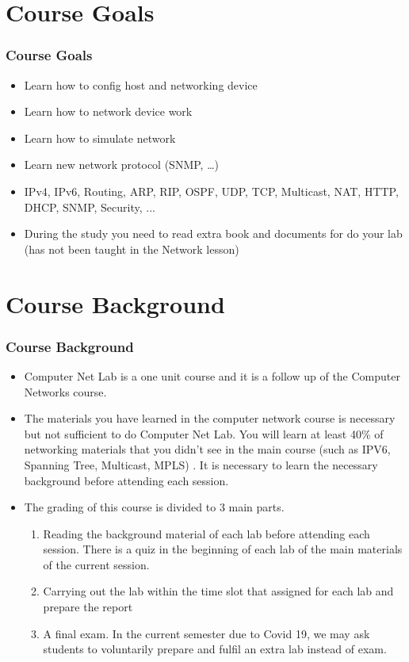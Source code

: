 \documentclass[aspectratio=169,15pt]{beamer}
\begin{document}
\section{Course Goals}
\begin{frame}
    \frametitle{Course Goals}

    \begin{itemize}
        \item Learn how to config host and networking device
        \item Learn how to network device work
        \item Learn how to simulate network
        \item Learn new network protocol (SNMP, \dots)
        \item IPv4, IPv6, Routing, ARP, RIP, OSPF, UDP, TCP, Multicast, NAT, HTTP, DHCP, SNMP, Security, ...         
        \item During the study you need to read extra book and documents for do your lab (has not been taught in the Network lesson)
    \end{itemize}

\end{frame}

\section{Course Background}
\begin{frame}
    \frametitle{Course Background}

    \begin{itemize}
        \item Computer Net Lab is a one unit course and it is a follow up of the Computer Networks course.
        \item The materials you have learned in the computer network course is necessary but not sufficient to do Computer Net Lab.
              You will learn at least 40\% of networking materials that you didn't see in the main course (such as IPV6, Spanning Tree, Multicast, MPLS) . It is necessary to learn the necessary background before attending each session.
        \item The grading of this course is divided to 3 main parts.
        \begin{enumerate}
            \item Reading the background material of each lab before attending each session. There is a quiz in the beginning of each lab of the main materials of the current session.
            \item Carrying out the lab within the time slot that assigned for each lab and prepare the report
            \item A final exam. In the current semester due to Covid 19, we may ask students to voluntarily prepare and fulfil an extra lab instead of exam.
        \end{enumerate}
    \end{itemize}


\end{frame}
\end{document}
